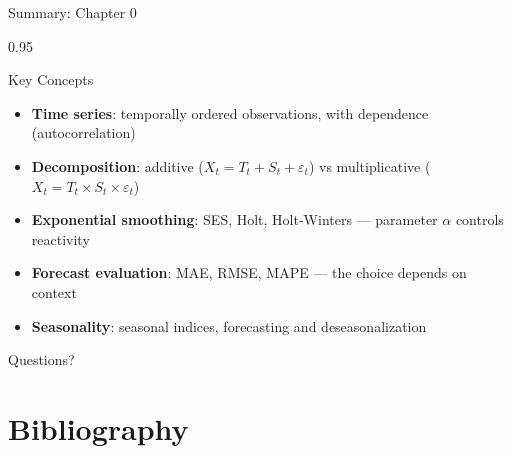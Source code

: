 \documentclass[9pt, aspectratio=169, t]{beamer}
\begin{document}
\begin{frame}{Summary: Chapter 0}
    \begin{cminipage}{0.95\textwidth}
    \begin{exampleblock}{Key Concepts}
        \begin{itemize}\setlength{\itemsep}{2pt}
            \item[\textcolor{MainBlue}{\textbf{1.}}] \textbf{Time series}: temporally ordered observations, with dependence (autocorrelation)
            \item[\textcolor{MainBlue}{\textbf{2.}}] \textbf{Decomposition}: additive ($X_t = T_t + S_t + \varepsilon_t$) vs multiplicative ($X_t = T_t \times S_t \times \varepsilon_t$)
            \item[\textcolor{MainBlue}{\textbf{3.}}] \textbf{Exponential smoothing}: SES, Holt, Holt-Winters --- parameter $\alpha$ controls reactivity
            \item[\textcolor{MainBlue}{\textbf{4.}}] \textbf{Forecast evaluation}: MAE, RMSE, MAPE --- the choice depends on context
            \item[\textcolor{MainBlue}{\textbf{5.}}] \textbf{Seasonality}: seasonal indices, forecasting and deseasonalization
        \end{itemize}
    \end{exampleblock}

    \vspace{0.5cm}
    \begin{center}
        \Large\textcolor{MainBlue}{Questions?}
    \end{center}
    \end{cminipage}
\end{frame}


\section{Bibliography}
\end{document}
